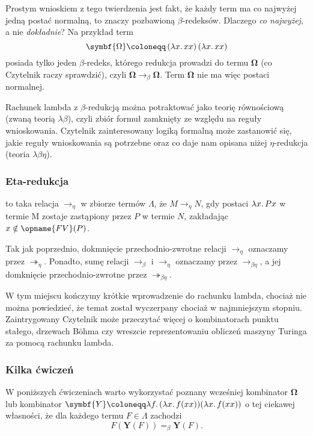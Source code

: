 \documentclass[polish,pretty]{angav}
\newcommand{\toto}{\twoheadrightarrow}
\newcommand{\FV}{\opname{FV}}
\begin{document}
Prostym wnioskiem z tego twierdzenia jest fakt, że każdy term ma co najwyżej jedną postać normalną, to znaczy pozbawioną $\beta$-redeksów.
Dlaczego \emph{co najwyżej}, a nie \emph{dokładnie}? Na przykład term
\[ \symbf{\Omega} \coloneqq \left(\lambda x\ldotp xx\right)\left(\lambda x\ldotp xx\right) \]
posiada tylko jeden $\beta$-redeks, którego redukcja prowadzi do termu $\symbf{\Omega}$ (co Czytelnik raczy sprawdzić), czyli $\symbf{\Omega} \to_\beta \symbf{\Omega}$. Term $\symbf{\Omega}$ nie ma więc postaci normalnej.

\begin{remark}
    Rachunek lambda z $\beta$-redukcją można potraktować jako teorię równościową (zwaną teorią $\lambda\beta$), czyli zbiór formuł zamknięty ze względu na reguły wnioskowania. Czytelnik zainteresowany logiką formalną może zastanowić się, jakie reguły wnioskowania są potrzebne oraz co daje nam opisana niżej $\eta$-redukcja (teoria $\lambda\beta\eta$).
\end{remark}

\subsubsection*{Eta-redukcja}

 to taka relacja $\to_\eta$ w zbiorze termów $\Lambda$, że $M \to_\eta N$, gdy  postaci $\lambda x\ldotp Px$ w termie M zostaje zastąpiony przez $P$ w termie $N$, zakładając $x \notin \FV(P)$.

Tak jak poprzednio, dokmnięcie przechodnio-zwrotne relacji $\to_\eta$ oznaczamy przez $\toto_\eta$. Ponadto, sumę relacji $\to_\beta$ i $\to_\eta$ oznaczamy przez $\to_{\beta\eta}$, a jej domknięcie przechodnio-zwrotne przez $\toto_{\beta\eta}$.


W tym miejscu kończymy krótkie wprowadzenie do rachunku lambda, chociaż nie można powiedzieć, że temat został wyczerpany chociaż w najmniejszym stopniu. Zaintrygowany Czytelnik może przeczytać więcej o kombinatorach punktu stałego, drzewach Böhma czy wreszcie reprezentowaniu obliczeń maszyny Turinga za pomocą rachunku lambda.

\subsubsection*{Kilka ćwiczeń}

W poniższych ćwiczeniach warto wykorzystać poznany wcześniej kombinator $\symbf{\Omega}$ lub kombinator $\symbf{Y} \coloneqq \lambda f\ldotp (\lambda x\ldotp f (xx)) (\lambda x\ldotp f (xx))$ o tej ciekawej własności, że dla każdego termu $F \in \Lambda$ zachodzi
\[ F(\symbf{Y}(F)) =_\beta \symbf{Y}(F). \]
\end{document}

